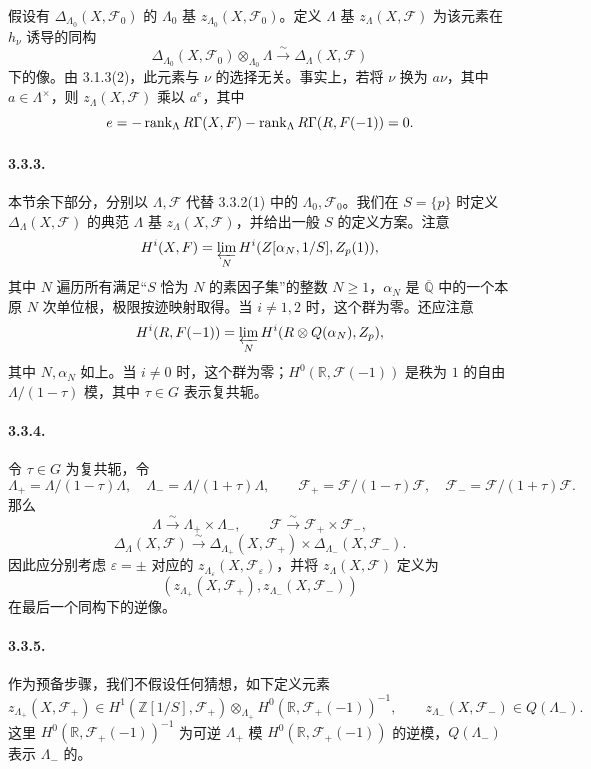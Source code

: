 假设有 $\Delta_{\Lambda_0}(X,\mathcal F_0)$ 的 $\Lambda_0$ 基 $z_{\Lambda_0}(X,\mathcal F_0)$。定义 $\Lambda$ 基 $z_\Lambda(X,\mathcal F)$ 为该元素在 $h_\nu$ 诱导的同构
\[
 \Delta_{\Lambda_0}(X,\mathcal F_0)\otimes_{\Lambda_0}\Lambda
 \xrightarrow{\sim}\Delta_\Lambda(X,\mathcal F)
\]
下的像。由 3.1.3(2)，此元素与 $\nu$ 的选择无关。事实上，若将 $\nu$ 换为 $a\nu$，其中 $a\in\Lambda^\times$，则 $z_\Lambda(X,\mathcal F)$ 乘以 $a^e$，其中
\[
 e=-\rank_\Lambda R\Gamma(X,\mathcal F)
 -\rank_\Lambda R\Gamma(\mathbb R,\mathcal F(-1))=0.
\]

\paragraph{3.3.3.} 本节余下部分，分别以 $\Lambda,\mathcal F$ 代替 3.3.2(1) 中的 $\Lambda_0,\mathcal F_0$。我们在 $S=\{p\}$ 时定义 $\Delta_\Lambda(X,\mathcal F)$ 的典范 $\Lambda$ 基 $z_\Lambda(X,\mathcal F)$，并给出一般 $S$ 的定义方案。注意
\[
 H^i(X,\mathcal F)=\varprojlim_N H^i(\mathbb Z[\alpha_N,1/S],\mathbb Z_p(1)),
\]
其中 $N$ 遍历所有满足“$S$ 恰为 $N$ 的素因子集”的整数 $N\ge1$，$\alpha_N$ 是 $\overline{\mathbb Q}$ 中的一个本原 $N$ 次单位根，极限按迹映射取得。当 $i\ne1,2$ 时，这个群为零。还应注意
\[
 H^i(\mathbb R,\mathcal F(-1))
 =\varprojlim_N H^i(\mathbb R\otimes\mathbb Q(\alpha_N),\mathbb Z_p),
\]
其中 $N,\alpha_N$ 如上。当 $i\ne0$ 时，这个群为零；$H^0(\mathbb R,\mathcal F(-1))$ 是秩为 $1$ 的自由 $\Lambda/(1-\tau)$ 模，其中 $\tau\in G$ 表示复共轭。

\paragraph{3.3.4.} 令 $\tau\in G$ 为复共轭，令
\[
 \Lambda_+=\Lambda/(1-\tau)\Lambda,\quad
 \Lambda_-=\Lambda/(1+\tau)\Lambda,
 \qquad
 \mathcal F_+=\mathcal F/(1-\tau)\mathcal F,\quad
 \mathcal F_-=\mathcal F/(1+\tau)\mathcal F.
\]
那么
\[
 \Lambda\xrightarrow{\sim}\Lambda_+\times\Lambda_-,\qquad
 \mathcal F\xrightarrow{\sim}\mathcal F_+\times\mathcal F_-,
\]
\[
 \Delta_\Lambda(X,\mathcal F)\xrightarrow{\sim}
 \Delta_{\Lambda_+}(X,\mathcal F_+)\times\Delta_{\Lambda_-}(X,\mathcal F_-).
\]
因此应分别考虑 $\varepsilon=\pm$ 对应的 $z_{\Lambda_\varepsilon}(X,\mathcal F_\varepsilon)$，并将 $z_\Lambda(X,\mathcal F)$ 定义为
\[(z_{\Lambda_+}(X,\mathcal F_+),z_{\Lambda_-}(X,\mathcal F_-))\]
在最后一个同构下的逆像。

\paragraph{3.3.5.} 作为预备步骤，我们不假设任何猜想，如下定义元素
\[
 z_{\Lambda_+}(X,\mathcal F_+)
 \in H^1(\mathbb Z[1/S],\mathcal F_+)
 \otimes_{\Lambda_+}H^0(\mathbb R,\mathcal F_+(-1))^{-1},
 \qquad
 z_{\Lambda_-}(X,\mathcal F_-)\in Q(\Lambda_-).
\]
这里 $H^0(\mathbb R,\mathcal F_+(-1))^{-1}$ 为可逆 $\Lambda_+$ 模 $H^0(\mathbb R,\mathcal F_+(-1))$ 的逆模，$Q(\Lambda_-)$ 表示 $\Lambda_-$ 的。

